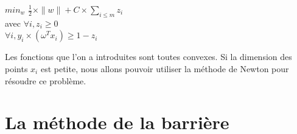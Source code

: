 \documentclass{article}
\begin{document}
           \begin{centre}
           $min_{w}$ $\frac{1}{2} \times \|w\| + C \times \sum_{i \leq m}z_i$\\
           avec $\forall i, z_i \geq 0$\\
           $\forall i, y_i \times (\omega^{T}x_i) \geq 1 - z_i$\\
           \end{centre}

\bigskip

Les fonctions que l'on a introduites sont toutes convexes. Si la dimension des points $x_i$ est petite, nous allons pouvoir utiliser la méthode de Newton pour résoudre ce problème.

\section{La méthode de la barrière}
\end{document}
